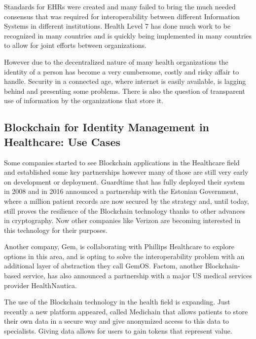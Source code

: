 \documentclass[]{llncs}
\begin{document}
Standards for EHRs were created and many failed to bring the much needed 
consensus that was required for interoperability between different 
Information Systems in different institutions. 
Health Level 7 has done much work to be recognized in many countries and 
is quickly being implemented in many countries to allow for joint efforts 
between organizations.

However due to the decentralized nature of many health organizations the 
identity of a person has become a very cumbersome, costly and risky affair to handle. 
Security in a connected age, where internet is easily available, is lagging behind 
and presenting some problems. 
There is also the question of transparent use of information by the organizations 
that store it.
%

\subsection{Blockchain for Identity Management in Healthcare: Use Cases}
Some companies started to see Blockchain applications in the Healthcare field 
and established some key partnerships however many of those are still very early 
on development or deployment. Guardtime that has fully deployed their system in 2008 and 
in 2016 announced a partnership with the Estonian Government, where a million patient records 
are now secured by the strategy and, until today, still proves the resilience of the 
Blockchain technology thanks to other advances in cryptography. Now other companies like 
Verizon are becoming interested in this technology for their purposes.\cite{GuardTime2018}

Another company, Gem, is collaborating with Phillips Healthcare to explore options 
in this area, and is opting to solve the interoperability problem with an additional 
layer of abstraction they call GemOS. 
Factom, another Blockchain-based service, has also announced a partnership with a 
major US medical services provider HealthNautica.\cite{BlockchainCompHealth2017,FactomPartnership2017}

The use of the Blockchain technology in the health field is expanding. Just recently a new 
platform appeared, called Medichain that allows patients to store their own data in a secure 
way and give anonymized access to this data to specialists. Giving data allows for users to gain 
tokens that represent value. \cite{MediChain2018} 

\end{document}
